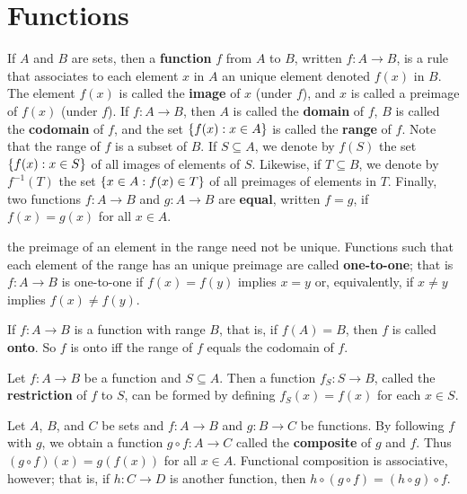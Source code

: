 \chapter{Functions}\label{ch:b}

\begin{defn}\label{b.0.1}
  If \(A\) and \(B\) are sets, then a \textbf{function} \(f\) from \(A\) to \(B\), written \(f : A \to B\), is a rule that associates to each element \(x\) in \(A\) an unique element denoted \(f(x)\) in \(B\).
  The element \(f(x)\) is called the \textbf{image} of \(x\) (under \(f\)), and \(x\) is called a preimage of \(f(x)\) (under \(f\)).
  If \(f : A \to B\), then \(A\) is called the \textbf{domain} of \(f\), \(B\) is called the \textbf{codomain} of \(f\), and the set \(\left\lbrace f(x) : x \in A\right\rbrace\) is called the \textbf{range} of \(f\).
  Note that the range of \(f\) is a subset of \(B\).
  If \(S \subseteq A\), we denote by \(f(S)\) the set \(\left\lbrace f(x) : x \in S\right\rbrace\) of all images of elements of \(S\).
  Likewise, if \(T \subseteq B\), we denote by \(f^{-1}(T)\) the set \(\left\lbrace x \in A : f(x) \in T\right\rbrace\) of all preimages of elements in \(T\).
  Finally, two functions \(f : A \to B\) and \(g : A \to B\) are \textbf{equal}, written \(f = g\), if \(f(x) = g(x)\) for all \(x \in A\).
\end{defn}

\begin{defn}\label{b.0.2}
  the preimage of an element in the range need not be unique.
  Functions such that each element of the range has an unique preimage are called \textbf{one-to-one};
  that is \(f : A \to B\) is one-to-one if \(f(x) = f(y)\) implies \(x = y\) or, equivalently, if \(x \neq y\) implies \(f(x) \neq f(y)\).
\end{defn}

\begin{defn}\label{b.0.3}
  If \(f : A \to B\) is a function with range \(B\), that is, if \(f(A) = B\), then \(f\) is called \textbf{onto}.
  So \(f\) is onto iff the range of \(f\) equals the codomain of \(f\).
\end{defn}

\begin{defn}\label{b.0.4}
  Let \(f : A \to B\) be a function and \(S \subseteq A\).
  Then a function \(f_S : S \to B\), called the \textbf{restriction} of \(f\) to \(S\), can be formed by defining \(f_S(x) = f(x)\) for each \(x \in S\).
\end{defn}

\begin{defn}\label{b.0.5}
  Let \(A\), \(B\), and \(C\) be sets and \(f : A \to B\) and \(g : B \to C\) be functions.
  By following \(f\) with \(g\), we obtain a function \(g \circ f : A \to C\) called the \textbf{composite} of \(g\) and \(f\).
  Thus \((g \circ f)(x) = g(f(x))\) for all \(x \in A\).
  Functional composition is associative, however;
  that is, if \(h : C \to D\) is another function, then \(h \circ (g \circ f) = (h \circ g) \circ f\).
\end{defn}

